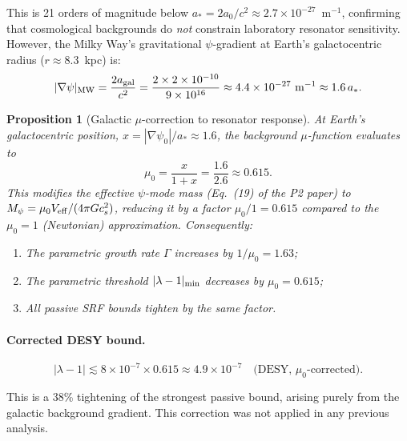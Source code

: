 \documentclass[11pt,twocolumn]{article}
\newcommand{\lam}{\lambda}
\newcommand{\Mpsi}{M_\psi}
\newcommand{\astar}{a_*}
\newtheorem{proposition}{Proposition}
\begin{document}
This is 21 orders of magnitude below $\astar = 2a_0/c^2 \approx
2.7\times10^{-27}$~m$^{-1}$, confirming that cosmological backgrounds
do \emph{not} constrain laboratory resonator sensitivity. However,
the Milky Way's gravitational $\psi$-gradient at Earth's galactocentric
radius ($r \approx 8.3$~kpc) is:
\begin{equation}
|\nabla\psi|_{\rm MW} = \frac{2 a_{\rm gal}}{c^2}
= \frac{2 \times 2\times10^{-10}}{9\times10^{16}}
\approx 4.4\times10^{-27}~\text{m}^{-1}
\approx 1.6\,\astar.
\label{eq:mw_gradient}
\end{equation}

\begin{proposition}[Galactic $\mu$-correction to resonator response]
\label{prop:mu_correction}
At Earth's galactocentric position, $x = |\nabla\psi_0|/\astar \approx 1.6$,
the background $\mu$-function evaluates to
\begin{equation}
\mu_0 = \frac{x}{1+x} = \frac{1.6}{2.6} \approx 0.615.
\end{equation}
This modifies the effective $\psi$-mode mass (Eq.~(19) of the P2 paper)
to $\Mpsi = \mu_0 V_{\rm eff}/(4\pi G c_s^2)$, reducing it by a factor
$\mu_0/1 = 0.615$ compared to the $\mu_0 = 1$ (Newtonian) approximation.
Consequently:
\begin{enumerate}[nosep]
\item The parametric growth rate $\Gamma$ increases by $1/\mu_0 = 1.63$;
\item The parametric threshold $|\lam-1|_{\rm min}$ decreases by $\mu_0 = 0.615$;
\item All passive SRF bounds tighten by the same factor.
\end{enumerate}
\end{proposition}

\paragraph{Corrected DESY bound.}
\begin{equation}
\boxed{|\lam-1| \lesssim 8\times10^{-7} \times 0.615
\approx 4.9\times10^{-7}
\quad\text{(DESY, $\mu_0$-corrected)}.}
\label{eq:desy_corrected}
\end{equation}

This is a 38\% tightening of the strongest passive bound, arising
purely from the galactic background gradient. This correction was
not applied in any previous analysis.


\end{document}
